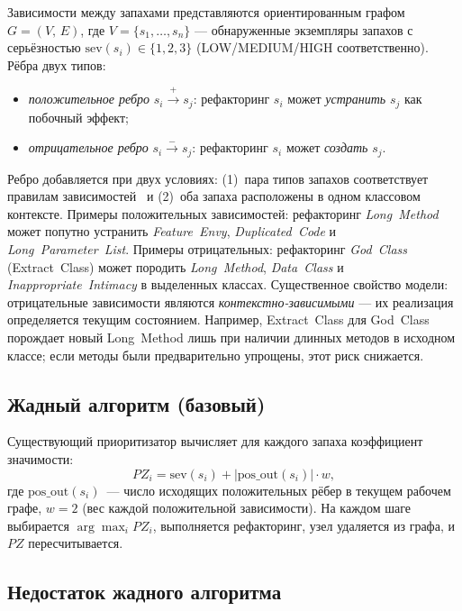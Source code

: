 \documentclass[conference]{IEEEtran}
\begin{document}
Зависимости между запахами представляются ориентированным графом
$G = (V,\,E)$, где $V = \{s_1, \ldots, s_n\}$ --- обнаруженные экземпляры
запахов с серьёзностью $\mathrm{sev}(s_i) \in \{1,2,3\}$
(LOW/MEDIUM/HIGH соответственно).
Рёбра двух типов:
\begin{itemize}
  \item \textit{положительное ребро} $s_i \xrightarrow{+} s_j$:
        рефакторинг $s_i$ может \emph{устранить} $s_j$ как побочный эффект;
  \item \textit{отрицательное ребро} $s_i \xrightarrow{-} s_j$:
        рефакторинг $s_i$ может \emph{создать} $s_j$.
\end{itemize}
Ребро добавляется при двух условиях: (1)~пара типов запахов соответствует
правилам зависимостей~\cite{markovic2020} и (2)~оба запаха расположены
в одном классовом контексте.
Примеры положительных зависимостей: рефакторинг \textit{Long~Method} может
попутно устранить \textit{Feature~Envy}, \textit{Duplicated~Code} и
\textit{Long~Parameter~List}.
Примеры отрицательных: рефакторинг \textit{God~Class} (Extract~Class)
может породить \textit{Long~Method}, \textit{Data~Class} и
\textit{Inappropriate~Intimacy} в выделенных классах.
Существенное свойство модели: отрицательные зависимости являются
\textit{контекстно-зависимыми} --- их реализация определяется текущим
состоянием.
Например, Extract~Class для God~Class порождает новый Long~Method
лишь при наличии длинных методов в исходном классе; если методы
были предварительно упрощены, этот риск снижается.

\subsection{Жадный алгоритм (базовый)}

Существующий приоритизатор вычисляет для каждого запаха
коэффициент значимости:
\begin{equation}
  PZ_i = \mathrm{sev}(s_i) + |\mathrm{pos\_out}(s_i)| \cdot w,
  \label{eq:pz}
\end{equation}
где $\mathrm{pos\_out}(s_i)$~--- число исходящих положительных рёбер
в текущем рабочем графе, $w = 2$ (вес каждой положительной зависимости).
На каждом шаге выбирается $\arg\max_i PZ_i$, выполняется рефакторинг,
узел удаляется из графа, и $PZ$ пересчитывается.

\subsection{Недостаток жадного алгоритма}
\end{document}
